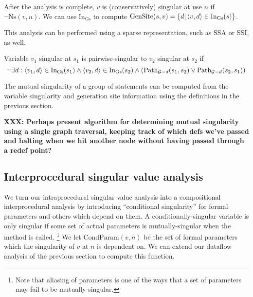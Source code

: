 \documentclass[11pt,notitlepage]{article}
\begin{document}
After the analysis is complete, $v$ is (conservatively) singular at
use $n$ if $\neg\text{Ns}(v,n)$.   We can use $\text{In}_\text{Gs}$ to
compute
$\text{GenSite}(s,v)=\left\{ d | \left\langle v,d \right\rangle\in\text{In}_\text{Gs}(s) \right\}$.

This analysis can be performed using a sparse representation, such as
SSA or SSI, as well.

Variable $v_1$ singular at $s_1$ is pairwise-singular to $v_2$
singular at $s_2$ if
\begin{displaymath}
\neg\exists 
     d : \left\langle v_1, d \right\rangle \in \text{In}_\text{Gs}(s_1) \wedge
         \left\langle v_2, d \right\rangle \in \text{In}_\text{Gs}(s_2) \wedge
\left(\text{Path}_{\mathcal{G}-d}(s_1, s_2) \vee
      \text{Path}_{\mathcal{G}-d}(s_2, s_1) \right)
\end{displaymath}

The mutual singularity of a group of statements can be computed from
the variable singularity and generation site information using the
definitions in the previous section.

\textbf{XXX: Perhaps present algorithm for determining mutual
singularity using a single graph traversal, keeping track of which
defs we've passed and halting when we hit another node without
having passed through a redef point?}

\subsection{Interprocedural singular value analysis}

We turn our intraprocedural singular value analysis into a compositional
interprocedural analysis by introducing ``conditional singularity''
for formal parameters and others which depend on them.  A
conditionally-singular variable is only singular if some set of actual
parameters is mutually-singular when the method is called.%
\footnote{Note that aliasing of parameters is one of the ways that
a set of parameters may fail to be mutually-singular.}
We let
$\text{CondParam}(v,n)$ be the set of formal parameters which the
singularity of $v$ at $n$ is dependent on.  We can extend our dataflow
analysis of the previous section to compute this function.
\end{document}
